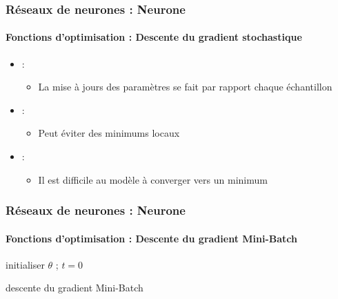 \documentclass[xcolor=table]{beamer}
\begin{document}
\begin{frame}
\frametitle{Réseaux de neurones : Neurone}
\framesubtitle{Fonctions d'optimisation : Descente du gradient stochastique}

\begin{itemize}
\item {} : 
\begin{itemize}
	\item La mise à jours des paramètres se fait par rapport chaque échantillon
\end{itemize}
\item {} : 
\begin{itemize}
	\item Peut éviter des minimums locaux
\end{itemize}
\item {} : 
\begin{itemize}
	\item Il est difficile au modèle à converger vers un minimum
\end{itemize}
\end{itemize}

\end{frame}


\begin{frame}
\frametitle{Réseaux de neurones : Neurone}
\framesubtitle{Fonctions d'optimisation : Descente du gradient Mini-Batch}

\begin{algorithm}[H]
	\KwResult{$ \theta $}
	initialiser $ \theta $ ; $ t = 0 $\;
	\caption{descente du gradient Mini-Batch}
\end{algorithm}

\end{frame}
\end{document}
